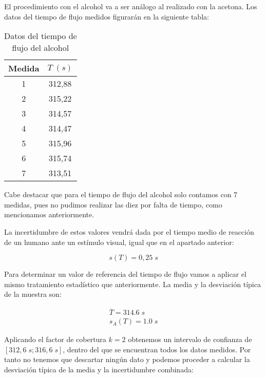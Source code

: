 \documentclass[a4paper,12pt,titlepage]{article}
\begin{document}
El procedimiento con el alcohol va a ser análogo al realizado con la acetona. Los datos del tiempo de flujo medidos figurarán en la siguiente tabla:

\begin{table}[h!]
    \centering
    \begin{tabular}{|c|c|}
    \hline
    Medida  & $T \;(s)$ \\ \hline
    1 & 312,88 \\ \hline
    2 & 315,22 \\ \hline
    3 & 314,57 \\ \hline
    4 & 314,47 \\ \hline
    5 & 315,96 \\ \hline
    6 & 315,74 \\ \hline
    7 & 313,51 \\ \hline
    \end{tabular}
    \caption{Datos del tiempo de flujo del alcohol}
    \label{T alcohol}
    \end{table}

Cabe destacar que para el tiempo de flujo del alcohol solo contamos con 7 medidas, pues no pudimos realizar las diez por falta de tiempo, como mencionamos anteriormente.

\par La incertidumbre de estos valores vendrá dada por el tiempo medio de reacción de un humano ante un estímulo visual, igual que en el apartado anterior:

\begin{equation}
    s(T) = 0,25 \; s
\end{equation}    

Para determinar un valor de referencia del tiempo de flujo vamos a aplicar el mismo tratamiento estadístico que anteriormente. La media y la desviación típica de la muestra son:

\begin{equation}
    \begin{gathered}
        \overline{T} = 314.6\; s\\
        s_A(T) =  1.0 \; s
    \end{gathered}
\end{equation}

Aplicando el factor de cobertura $k=2$ obtenemos un intervalo de confianza de $[312,6 \;s;316,6\; s]$, dentro del que se encuentran todos los datos medidos. Por tanto no tenemos que descartar ningún dato y podemos proceder a calcular la desviación típica de la media y la incertidumbre combinada:
\end{document}
